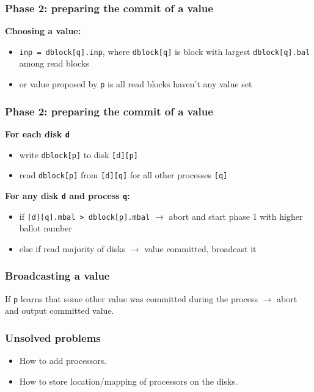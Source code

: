 \documentclass[10pt,utf8]{beamer}
\begin{document}
\begin{frame}
    \frametitle{Phase 2: preparing the commit of a value}
    \centering
    \textbf{Choosing a value:}
    \vspace{0.5cm}
    \begin{itemize}
     \item \texttt{inp = dblock[q].inp}, where \texttt{dblock[q]} is block with largest \texttt{dblock[q].bal} among read blocks
     \item or value proposed by \texttt{p} is all read blocks haven't any value set
    \end{itemize}
\end{frame}

\begin{frame}
    \frametitle{Phase 2: preparing the commit of a value}
    
    \centering
    \textbf{For each disk \texttt{d}}
    \vspace{0.5cm}
    \begin{itemize}
        \item write \texttt{dblock[p]} to disk \texttt{[d][p]}
        \item read \texttt{dblock[p]} from \texttt{[d][q]} for all other processes \texttt{[q]}
    \end{itemize}
    
    \vspace{1cm}
    
    \centering
    \textbf{For any disk \texttt{d} and process \texttt{q}:}
    \vspace{0.5cm}
    \begin{itemize}
        \item if \texttt{[d][q].mbal > dblock[p].mbal} $\rightarrow$ abort and start phase 1 with higher ballot number
        \item else if read majority of disks $\rightarrow$ value committed, broadcast it
    \end{itemize}
\end{frame}

\begin{frame}
    \frametitle{Broadcasting a value}
    \centering
    If \texttt{p} learns that some other value was committed during the process $\rightarrow$ abort and output committed value.
\end{frame}


\begin{frame}
 \frametitle{Unsolved problems}
 \begin{itemize}
  \item How to add processors.
  \item How to store location/mapping of processors on the disks.
 \end{itemize}
\end{frame}
\end{document}
